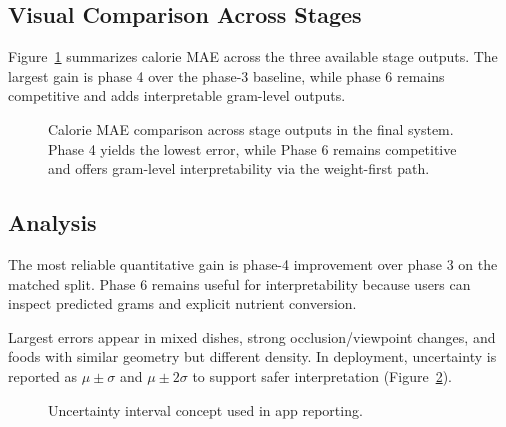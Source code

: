 \documentclass[10pt,twocolumn,letterpaper]{article}
\begin{document}
\subsection{Visual Comparison Across Stages}
Figure~\ref{fig:maecompare} summarizes calorie MAE across the three available stage outputs. The largest gain is phase 4 over the phase-3 baseline, while phase 6 remains competitive and adds interpretable gram-level outputs.

\begin{figure}[t]
\centering
{}
\caption{Calorie MAE comparison across stage outputs in the final system. Phase 4 yields the lowest error, while Phase 6 remains competitive and offers gram-level interpretability via the weight-first path.}
\label{fig:maecompare}
\end{figure}

\subsection{Analysis}
The most reliable quantitative gain is phase-4 improvement over phase 3 on the matched split. Phase 6 remains useful for interpretability because users can inspect predicted grams and explicit nutrient conversion.

Largest errors appear in mixed dishes, strong occlusion/viewpoint changes, and foods with similar geometry but different density. In deployment, uncertainty is reported as $\mu\pm\sigma$ and $\mu\pm2\sigma$ to support safer interpretation (Figure~\ref{fig:uncertainty}).

\begin{figure}[!htbp]
\centering
{}
\caption{Uncertainty interval concept used in app reporting.}
\label{fig:uncertainty}
\end{figure}
\end{document}
